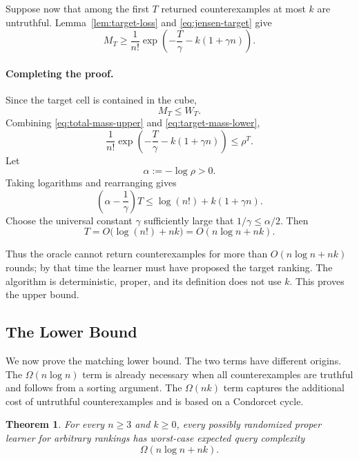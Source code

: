 \documentclass[11pt]{article}
\newtheorem{theorem}{Theorem}[section]
\theoremstyle{definition}
\theoremstyle{remark}
\begin{document}
Suppose now that among the first $T$ returned counterexamples at most $k$
are untruthful. Lemma~\ref{lem:target-loss} and
\eqref{eq:jensen-target} give
\[
    M_T
    \geq
    \frac1{n!}
    \exp\left(
        -\frac{T}{\gamma}
        -k(1+\gamma n)
    \right).
    \tag{6}\label{eq:target-mass-lower}
\]


\paragraph{Completing the proof.}

Since the target cell is contained in the cube,
\[
    M_T\leq W_T.
\]
Combining \eqref{eq:total-mass-upper} and
\eqref{eq:target-mass-lower},
\[
    \frac1{n!}
    \exp\left(
        -\frac{T}{\gamma}
        -k(1+\gamma n)
    \right)
    \leq
    \rho^T.
\]
Let
\[
    \alpha:=-\log\rho>0.
\]
Taking logarithms and rearranging gives
\[
    \left(\alpha-\frac1\gamma\right)T
    \leq
    \log(n!)+k(1+\gamma n).
\]
Choose the universal constant $\gamma$ sufficiently large that
$1/\gamma\leq\alpha/2$. Then
\[
    T
    =
    O\bigl(\log(n!)+nk\bigr)
    =
    O(n\log n+nk).
\]

Thus the oracle cannot return counterexamples for more than
$O(n\log n+nk)$ rounds; by that time the learner must have proposed the
target ranking. The algorithm is deterministic, proper, and its definition
does not use $k$. This proves the upper bound.


\subsection{The Lower Bound}
\label{sec:arbitrary-lower}

We now prove the matching lower bound. The two terms have different
origins. The $\Omega(n\log n)$ term is already necessary when all
counterexamples are truthful and follows from a sorting argument. The
$\Omega(nk)$ term captures the additional cost of untruthful
counterexamples and is based on a Condorcet cycle.

\begin{theorem}
\label{thm:arbitrary-lower}
For every $n\geq 3$ and $k\geq 0$, every possibly randomized proper learner
for arbitrary rankings has worst-case expected query complexity
\[
    \Omega(n\log n+nk).
\]
\end{theorem}
\end{document}
